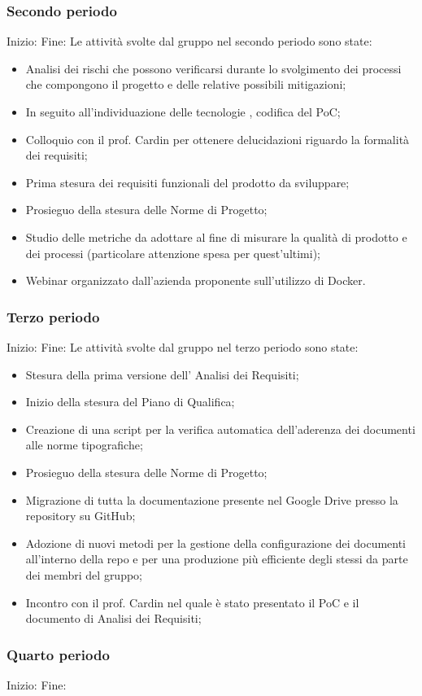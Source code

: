 \subsubsection{Secondo periodo}
Inizio: \hline
Fine: \hline
{}
Le attività svolte dal gruppo nel secondo periodo sono state:
\begin{itemize}
    \item Analisi dei rischi che possono verificarsi durante lo svolgimento dei processi 
    che compongono il progetto e delle relative possibili mitigazioni;
    \item In seguito all'individuazione delle tecnologie , codifica del PoC;
    \item Colloquio con il prof. Cardin per ottenere delucidazioni riguardo la formalità dei requisiti;
    \item Prima stesura dei requisiti funzionali del prodotto da sviluppare;
    \item Prosieguo della stesura delle Norme di Progetto;
    \item Studio delle metriche da adottare al fine di misurare la qualità di prodotto e dei processi (particolare attenzione
    spesa per quest'ultimi);
    \item Webinar organizzato dall'azienda proponente sull'utilizzo di Docker.
\end{itemize}
\subsubsection{Terzo periodo}
Inizio: \hline
Fine: \hline
{}
Le attività svolte dal gruppo nel terzo periodo sono state:
\begin{itemize}
    \item Stesura della prima versione dell' Analisi dei Requisiti;
    \item Inizio della stesura del Piano di Qualifica;
    \item Creazione di una script per la verifica automatica dell'aderenza dei documenti alle norme tipografiche;
    \item Prosieguo della stesura delle Norme di Progetto;
    \item Migrazione di tutta la documentazione presente nel Google Drive presso la repository su GitHub;
    \item Adozione di nuovi metodi per la gestione della configurazione dei documenti all'interno della repo
    e per una produzione più efficiente degli stessi da parte dei membri del gruppo;
    \item Incontro con il prof. Cardin nel quale è stato presentato il PoC e il documento di Analisi dei Requisiti;
\end{itemize}
\subsubsection{Quarto periodo}
Inizio: \hline
Fine: \hline
{}
